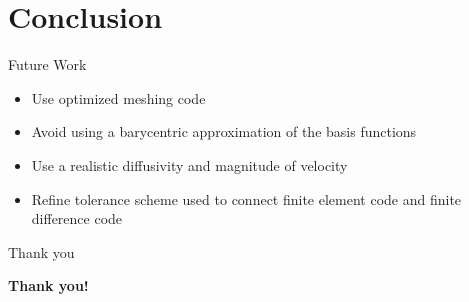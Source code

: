 \documentclass[10pt]{beamer}
\begin{document}
\section{Conclusion}

\begin{frame}{Future Work} \label{FW}
\begin{itemize}
\item Use optimized meshing code
\item Avoid using a barycentric approximation of the basis functions
\item Use a realistic diffusivity and magnitude of velocity
\item Refine tolerance scheme used to connect finite element code and finite difference code
\end{itemize}

\hyperlink{Questions}{}
\end{frame}

\begin{frame}{Thank you}
    \begin{center}
        {\bf Thank you!}
    \end{center}
\end{frame}
\end{document}
